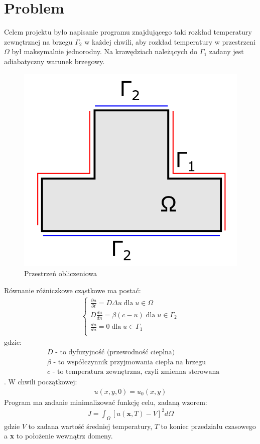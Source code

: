 \documentclass{article}
\begin{document}
	\section{Problem}
Celem projektu było napisanie programu znajdującego taki rozkład temperatury zewnętrznej na brzegu $\Gamma_2$ w każdej chwili, aby rozkład temperatury w przestrzeni $\Omega$ był maksymalnie jednorodny. Na krawędziach należących do $\Gamma_1$ zadany jest adiabatyczny warunek brzegowy. 
\begin{figure}[H]
	\centering
	\includegraphics[width=0.5\linewidth]{plyta}
	\caption{Przestrzeń obliczeniowa}
	\label{fig:plyta}
\end{figure}
Równanie różniczkowe cząstkowe ma postać:
\begin{align*}
	\begin{cases}
		\frac{\partial u}{\partial t} = D\Delta u\; \text{dla}\; u\in\Omega\\
		D\frac{du}{dn} = \beta(c-u) \; \text{dla}\; u\in\Gamma_2\\
		\frac{du}{dn} = 0 \; \text{dla}\; u\in\Gamma_1\\
	\end{cases}
\end{align*}
gdzie:
\begin{align*}
	&D \text{ - to dyfuzyjność (przewodność cieplna)}\\
	&\beta \text{ - to współczynnik przyjmowania ciepła na brzegu}\\
	&c \text{ - to temperatura zewnętrzna, czyli zmienna sterowana}
\end{align*}.
W chwili początkowej:
\begin{align*}
	u(x,y, 0) = u_0(x,y)
\end{align*}
Program ma zadanie minimalizować funkcję celu, zadaną wzorem:
\begin{align*}
	J=\int_{\Omega}[u(\textbf{x},T)-V]^2d\Omega
\end{align*}
gdzie $V$ to zadana wartość średniej temperatury, $T$ to koniec przedziału czasowego a \textbf{x} to położenie wewnątrz domeny.
\end{document}
